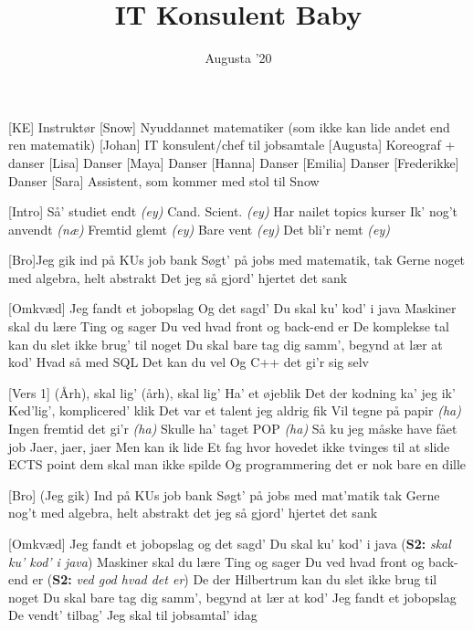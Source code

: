 \documentclass[a4paper, 11pt]{article}
\title{IT Konsulent Baby}
\author{Augusta '20}
\begin{document}
\maketitle

\begin{roles}  
[KE] Instruktør
[Snow] Nyuddannet matematiker (som ikke kan lide andet end ren matematik) 
[Johan] IT konsulent/chef til jobsamtale
[Augusta] Koreograf + danser
[Lisa] Danser
[Maya] Danser
[Hanna] Danser
[Emilia] Danser
[Frederikke] Danser
[Sara] Assistent, som kommer med stol til Snow
\end{roles}

\begin{song}
[Intro] Så' studiet endt \textit{(ey)} 
Cand. Scient. \textit{(ey)} 
Har nailet topics kurser 
Ik' nog't anvendt \textit{(næ)}
Fremtid glemt \textit{(ey)}
Bare vent \textit{(ey)} 
Det bli'r nemt \textit{(ey)} 


[Bro]Jeg gik ind på KUs job bank 
Søgt’ på jobs med matematik, tak
Gerne noget med algebra, helt abstrakt 
Det jeg så gjord’ hjertet det sank 


[Omkvæd] Jeg fandt et jobopslag 
Og det sagd’ 
Du skal ku’ kod’ i java
Maskiner skal du lære
Ting og sager 
Du ved hvad front og back-end er 
De komplekse tal kan du slet ikke brug' til noget 
Du skal bare tag dig samm’, begynd at lær at kod’
Hvad så med SQL
Det kan du vel
Og C++ det gi’r sig selv

[Vers 1] (Årh), skal lig’ (årh), skal lig’ 
Ha’ et øjeblik
Det der kodning ka' jeg ik' 
Ked'lig', komplicered' klik 
Det var et talent jeg aldrig fik
Vil tegne på papir \textit{(ha)}
Ingen fremtid det gi’r \textit{(ha)}
Skulle ha' taget POP \textit{(ha)}
Så ku jeg måske have fået job
Jaer, jaer, jaer
Men kan ik lide 
Et fag hvor hovedet ikke tvinges til at slide
ECTS point dem skal man ikke spilde 
Og programmering det er nok bare en dille 

[Bro] (Jeg gik) Ind på KUs job bank 
Søgt’ på jobs med mat’matik tak
Gerne nog’t med algebra, helt abstrakt 
det jeg så gjord’ hjertet det sank 


[Omkvæd] 
Jeg fandt et jobopslag 
og det sagd’ 
Du skal ku’ kod’ i java (\textbf{S2:} \textit{skal ku' kod' i java})
Maskiner skal du lære
Ting og sager
Du ved hvad front og back-end er (\textbf{S2:} \textit{ved god hvad det er})
De der Hilbertrum kan du slet ikke brug til noget 
Du skal bare tag dig samm’, begynd at lær at kod’ 
Jeg fandt et jobopslag
De vendt’ tilbag’
Jeg skal til jobsamtal’ idag


\end{song}
\end{document}
